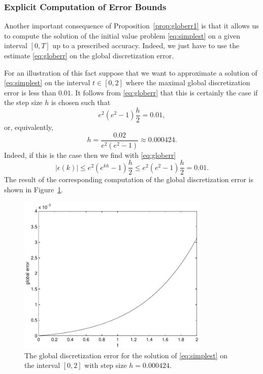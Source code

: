 \documentclass{ximera}
\begin{document}
\subsubsection*{Explicit Computation of Error Bounds}

Another important consequence of Proposition~\ref{prop:globerr1} is
that it allows us to compute the solution of the initial value
problem \eqref{eq:simplest} on a given interval $[0,T]$ up to a
prescribed accuracy.  Indeed, we just have to use the estimate
\eqref{eq:globerr} on the global discretization error.  

For an illustration of this fact suppose that we want to approximate 
a solution of \eqref{eq:simplest} on the interval $t\in [0,2]$
where the maximal global discretization 
error is less than $0.01$.
It follows from \eqref{eq:globerr} that this is certainly the case if the
step size $h$ is chosen such that
\[
e^2(e^2-1)\frac{h}{2} = 0.01,
\]
or, equivalently,
\[
h = \frac{0.02}{e^2(e^2-1)} \approx 0.000424.
\]
Indeed, if this is the case then we find  with \eqref{eq:globerr}
\[
|\epsilon(k)| \le e^2(e^{kh}-1)\frac{h}{2} \le e^2(e^2-1)\frac{h}{2} = 0.01.
\]
The result of the corresponding \Matlab computation of the global
discretization error is shown in Figure~\ref{fig:globerr2}.
\begin{figure}[htb]
   \centerline{%
   \includegraphics[width=3.6in]{../figures/globerr5.pdf}}
   \caption{The global discretization error for the solution of
   \protect\eqref{eq:simplest} on the interval $[0,2]$ with
   step size $h=0.000424$.}
   \label{fig:globerr2}
\end{figure}





\end{document}
